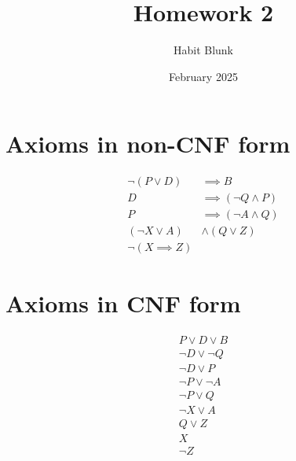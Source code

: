 \documentclass{article}
\title{Homework 2}
\author{Habit Blunk}
\date{February 2025}
\begin{document}
\maketitle

\section*{Axioms in non-CNF form}
\begin{align*}
   \neg (P \lor D) &\implies B \\
   D &\implies (\neg Q \land P) \\
   P &\implies (\neg A \land Q) \\
   (\neg X \lor A) &\land (Q \lor Z) \\
   \neg (X \implies Z)
\end{align*}

\section*{Axioms in CNF form}
\begin{align*}
   P \lor D \lor B \\
   \neg D \lor \neg Q \\
   \neg D \lor P \\
   \neg P \lor \neg A \\
   \neg P \lor Q \\
   \neg X \lor A \\
   Q \lor Z \\
   X \\
   \neg Z
\end{align*}
\end{document}
